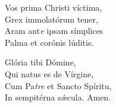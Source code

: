 Vos prima Christi ví\-ctima,\\
Grex immolatórum tener,\\
Aram ant\textit{e} i\-psam símplices\\
Palma et corónis lúditis.

Glória tibi Dómine,\\
Qui natus es de Vírgine,\\
Cum Pa\tinyhspace\textit{tre} et San\-cto Spíritu,\\
In sempitérna sǽcula.
Amen.
